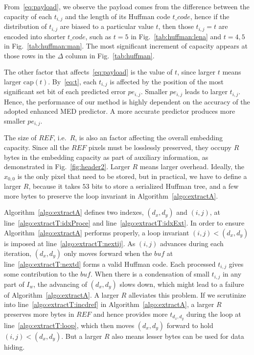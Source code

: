 \documentclass{elsarticle}
\begin{document}
	From~\eqref{eq:payload}, we observe the payload comes from the difference between the capacity of each \(t_{i, j}\) and the length of its Huffman code \(t\_code\), hence if the distribution of \(t_{i, j}\) are biased to a particular value \(t\), then those \(t_{i, j} = t\) are encoded into shorter \(t\_code\), such as \(t = 5\) in Fig.~\ref{tab:huffman:lena} and \(t = 4, 5\) in Fig.~\ref{tab:huffman:man}.
	The most significant increment of capacity appears at those rows in the \(\Delta\) column in Fig.~\ref{tab:huffman}.
	
	The other factor that affects~\eqref{eq:payload} is the value of \(t\), since larger \(t\) means larger \(\mathrm{cap}(t)\).
	By~\eqref{eq:t}, each \(t_{i, j}\) is affected by the position of the most significant set bit of each predicted error \(pe_{i, j}\).
	Smaller \(pe_{i, j}\) leads to larger \(t_{i, j}\).
	Hence, the performance of our method is highly dependent on the accuracy of the adopted enhanced MED predictor.
	A more accurate predictor produces more smaller \(pe_{i, j}\).
	
	The size of \(REF\), i.e.~\(R\), is also an factor affecting the overall embedding capacity.
	Since all the \(REF\) pixels must be losslessly preserved, they occupy \(R\) bytes in the embedding capacity as part of auxiliary information, as demonstrated in Fig.~\ref{fig:header2}.
	Larger \(R\) means larger overhead.
	Ideally, the \(x_{0, 0}\) is the only pixel that need to be stored, but in practical, we have to define a larger \(R\), 
	because it takes \(53\) bits to store a serialized Huffman tree, and a few more bytes to preserve the loop invariant in Algorithm~\ref{algo:extractA}.
	
	Algorithm~\ref{algo:extractA} defines two indexes, \((d_x, d_y)\) and \((i, j)\), at line~\ref{algo:extractT:idxProce} and line~\ref{algo:extractT:idxExt}. 
	In order to ensure Algorithm~\ref{algo:extractA} performs properly, a loop invariant \((i, j) < (d_x, d_y)\) is imposed at line~\ref{algo:extractT:nextij}.
	As \((i, j)\) advances during each iteration, \((d_x, d_y)\) only moves forward when the \(buf\) at line~\ref{algo:extractT:nextd} forms a valid Huffman code. 
	Each processed \(t_{i, j}\) gives some contribution to the \(buf\).
	When there is a condensation of small \(t_{i, j}\) in any part of \(I_w\), the advancing of \((d_x, d_y)\) slows down, which might lead to a failure of Algorithm~\ref{algo:extractA}.
	A larger \(R\) alleviates this problem.
	If we scrutinize into line~\ref{algo:extractT:incdref} in Algorithm~\ref{algo:extractA}, a larger \(R\) preserves more bytes in \(REF\)  and hence provides more \(t_{d_x, d_y}\) during the loop at line~\ref{algo:extractT:loop}, which then moves \((d_x, d_y)\) forward to hold \((i, j) < (d_x, d_y)\).
	But a larger \(R\) also means lesser bytes can be used for data hiding.
	
\end{document}
